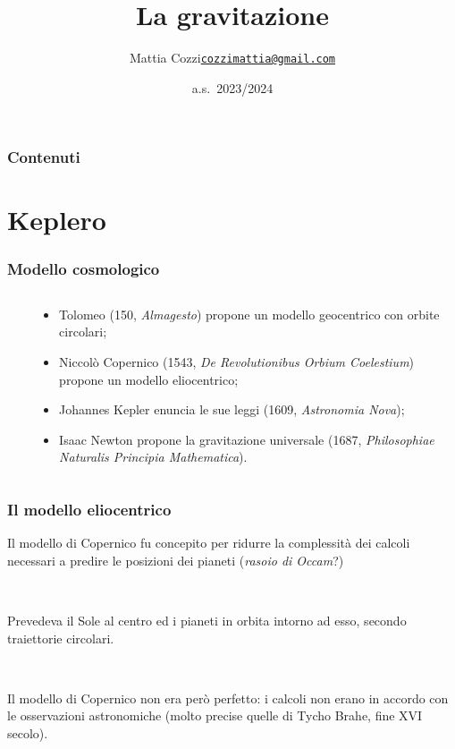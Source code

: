 \documentclass[]{beamer}
\title{La gravitazione}
\author{\texorpdfstring{Mattia Cozzi\newline\href{mailto:cozzimattia@gmail.com}{\texttt{cozzimattia@gmail.com}}}{Mattia Cozzi}}
\date{a.s.~2023/2024}
\theoremstyle{plain}
\begin{document}
\begin{frame}
  \titlepage
\end{frame}





\begin{frame}
\frametitle{Contenuti}
\tableofcontents
\end{frame}


\section{Keplero}


\begin{frame}
\frametitle{Modello cosmologico}
\begin{columns}
\begin{column}{0.2\textwidth}
~
~
\end{column}
\begin{column}{0.6\textwidth}
\begin{itemize}
\item<1-> Tolomeo (150, \emph{Almagesto}) propone un modello \alert<1>{geocentrico} con orbite circolari;
\item<2-> Niccolò Copernico (1543, \emph{De Revolutionibus Orbium Coelestium}) propone un modello \alert<2>{eliocentrico};
\item<3-> Johannes Kepler enuncia le sue \alert<3>{leggi} (1609, \emph{Astronomia Nova});
\item<4-> Isaac Newton propone la \alert<4>{gravitazione universale} (1687, \emph{Philosophiae Naturalis Principia Mathematica}).
\end{itemize}
\end{column}
\end{columns}
\end{frame}

\begin{frame}
\frametitle{Il modello eliocentrico}
Il modello di Copernico fu concepito per ridurre la complessità dei calcoli necessari a predire le posizioni dei pianeti (\emph{rasoio di Occam}?)

~

Prevedeva il Sole al centro ed i pianeti in orbita intorno ad esso, secondo \alert{traiettorie circolari}.

~

Il modello di Copernico non era però perfetto: i calcoli non erano in accordo con le osservazioni astronomiche (molto precise quelle di Tycho Brahe, fine XVI secolo).
\end{frame}
\end{document}
